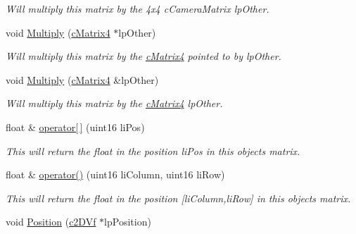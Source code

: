 \begin{DoxyCompactItemize}
\begin{DoxyCompactList}\small\item\em Will multiply this matrix by the 4x4 cCameraMatrix lpOther. \end{DoxyCompactList}\item 
\hypertarget{classc_camera_matrix4_a7d72fd4af4f6c427a71e7084a10ca1b3}{
void \hyperlink{classc_camera_matrix4_a7d72fd4af4f6c427a71e7084a10ca1b3}{Multiply} (\hyperlink{classc_matrix4}{cMatrix4} $\ast$lpOther)}
\label{classc_camera_matrix4_a7d72fd4af4f6c427a71e7084a10ca1b3}

\begin{DoxyCompactList}\small\item\em Will multiply this matrix by the \hyperlink{classc_matrix4}{cMatrix4} pointed to by lpOther. \end{DoxyCompactList}\item 
\hypertarget{classc_camera_matrix4_a81a6d3f77fb020b58ea788b42f581905}{
void \hyperlink{classc_camera_matrix4_a81a6d3f77fb020b58ea788b42f581905}{Multiply} (\hyperlink{classc_matrix4}{cMatrix4} \&lpOther)}
\label{classc_camera_matrix4_a81a6d3f77fb020b58ea788b42f581905}

\begin{DoxyCompactList}\small\item\em Will multiply this matrix by the \hyperlink{classc_matrix4}{cMatrix4} lpOther. \end{DoxyCompactList}\item 
\hypertarget{classc_camera_matrix4_ad9cd70439ad670a7ecc0e9198b5e0516}{
float \& \hyperlink{classc_camera_matrix4_ad9cd70439ad670a7ecc0e9198b5e0516}{operator\mbox{[}$\,$\mbox{]}} (uint16 liPos)}
\label{classc_camera_matrix4_ad9cd70439ad670a7ecc0e9198b5e0516}

\begin{DoxyCompactList}\small\item\em This will return the float in the position liPos in this objects matrix. \end{DoxyCompactList}\item 
\hypertarget{classc_camera_matrix4_a47de224c654b31aa8c22e55ec1d58ed0}{
float \& \hyperlink{classc_camera_matrix4_a47de224c654b31aa8c22e55ec1d58ed0}{operator()} (uint16 liColumn, uint16 liRow)}
\label{classc_camera_matrix4_a47de224c654b31aa8c22e55ec1d58ed0}

\begin{DoxyCompactList}\small\item\em This will return the float in the position \mbox{[}liColumn,liRow\mbox{]} in this objects matrix. \end{DoxyCompactList}\item 
\hypertarget{classc_camera_matrix4_a62fa2879539cc733e661d02b8a898578}{
void \hyperlink{classc_camera_matrix4_a62fa2879539cc733e661d02b8a898578}{Position} (\hyperlink{classc2_d_vf}{c2DVf} $\ast$lpPosition)}
\label{classc_camera_matrix4_a62fa2879539cc733e661d02b8a898578}


\end{DoxyCompactItemize}

